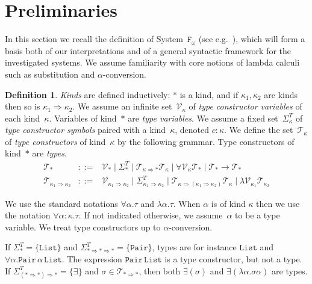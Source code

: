 \documentclass[a4paper,UKenglish,cleveref,autoref,numberwithinsect]{lipics-v2019}
\theoremstyle{definition}
\newtheorem{defn}[theorem]{Definition}
\newcommand{\Fomega}{\mathtt{F}_\omega}
\newcommand{\arrkind}{\Rightarrow}
\newcommand{\arrtype}{\rightarrow}
\newcommand{\Tc}{\mathcal{T}}
\newcommand{\Vc}{\mathcal{V}}
\newcommand{\List}{\mathtt{List}}
\newcommand{\Pair}{\mathtt{Pair}}
\begin{document}
\section{Preliminaries}\label{sec_preliminaries}

In this section we recall the definition of System~$\Fomega$ (see
e.g.~\cite[Section~11.7]{SorensenUrzyczyn2006}), which will form a
basis both of our interpretations and of a general syntactic framework
for the investigated systems. We assume familiarity with core notions
of lambda calculi such as substitution and $\alpha$-conversion.

\begin{defn}\label{def_types}
  \emph{Kinds} are defined inductively: $*$ is a kind, and if
  $\kappa_1,\kappa_2$ are kinds then so is $\kappa_1 \arrkind
  \kappa_2$. We assume an infinite set~$\Vc_\kappa$ of \emph{type
    constructor variables} of each kind~$\kappa$. Variables of
  kind~$*$ are \emph{type variables}. We assume a fixed
  set~$\Sigma^T_\kappa$ of \emph{type constructor symbols} paired with a
  kind~$\kappa$, denoted $c : \kappa$.
  We define the set~$\Tc_\kappa$ of \emph{type constructors} of
  kind~$\kappa$ by the following grammar.
  Type constructors of kind~$*$ are \emph{types}.
  \[
  \begin{array}{rcl}
    \Tc_{*} &::=& \Vc_{*}
    \mid \Sigma^T_{*} \mid
    \Tc_{\kappa\arrkind *}\Tc_{\kappa} \mid \forall\Vc_\kappa\Tc_* \mid \Tc_*\arrtype\Tc_* \\
    \Tc_{\kappa_1\arrkind\kappa_2} &::=& \Vc_{\kappa_1\arrkind\kappa_2}
    \mid \Sigma^T_{\kappa_1\arrkind\kappa_2} \mid
    \Tc_{\kappa\arrkind(\kappa_1\arrkind\kappa_2)}\Tc_{\kappa} \mid \lambda \Vc_{\kappa_1} \Tc_{\kappa_2}
  \end{array}
  \]

  We use the standard notations $\forall \alpha . \tau$ and $\lambda
  \alpha . \tau$. When $\alpha$ is of kind $\kappa$ then we use the
  notation $\forall \alpha : \kappa . \tau$. If not indicated
  otherwise, we assume~$\alpha$ to be a type variable. We treat type
  constructors up to $\alpha$-conversion.

  \begin{example}
  If $\Sigma^T_{*} = \{ \List \}$ and $\Sigma^T_{* \arrkind * \arrkind
  *} = \{ \Pair \}$, types are for instance $\List$ and
  $\forall \alpha.\Pair\,\alpha\,\List$.  The expression
  $\Pair\,\List$ is a type constructor, but not a type.  If
  $\Sigma^T_{(* \arrkind *) \arrkind *} = \{ \exists \}$ and
  $\sigma \in \Tc_{* \arrkind *}$, then both
  $\exists(\sigma)$ and $\exists (\lambda \alpha.\sigma\alpha)$ are
  types.
  \end{example}


\end{defn}
\end{document}
